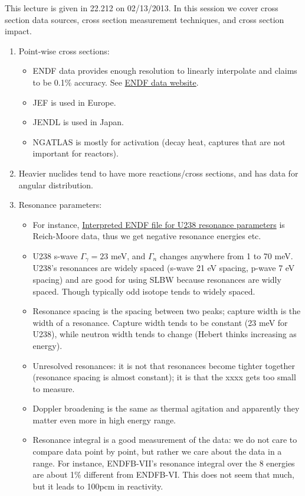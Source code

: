 \documentclass{school-22.211-notes}
\begin{document}
\clearpage
{}
This lecture is given in 22.212 on 02/13/2013. In this session we cover cross section data sources, cross section measurement techniques, and cross section impact.
\begin{enumerate}
\item Point-wise cross sections: 
  \begin{itemize}
  \item ENDF data provides enough resolution to linearly interpolate and claims to be 0.1\% accuracy. See \href{http://www.nndc.bnl.gov/sigma/}{ENDF data website}. 
  \item JEF is used in Europe.
  \item JENDL is used in Japan. 
  \item NGATLAS is mostly for activation (decay heat, captures that are not important for reactors). 
  \end{itemize}
\item Heavier nuclides tend to have more reactions/cross sections, and has data for angular distribution. 
\item Resonance parameters: 
  \begin{itemize}
  \item For instance, \href{http://www.nndc.bnl.gov/sigma/getInterpreted.jsp?evalid=15324&mf=2&mt=151}{Interpreted ENDF file for U238 resonance parameters} is Reich-Moore data, thus we get negative resonance energies etc. 
  \item U238 s-wave $\Gamma_{\gamma} = 23$ meV, and $\Gamma_n$ changes anywhere from 1 to 70 meV. U238's resonances are widely spaced (s-wave 21 eV spacing, p-wave 7 eV spacing) and are good for using SLBW because resonances are widly spaced. Though typically odd isotope tends to widely spaced. 
  \item Resonance spacing is the spacing between two peaks; capture width is the width of a resonance. Capture width tends to be constant (23 meV for U238), while neutron width tends to change (Hebert thinks increasing as energy). 
  \item Unresolved resonances: it is not that resonances become tighter together (resonance spacing is almost constant); it is that the xxxx gets too small to measure. 
  \item Doppler broadening is the same as thermal agitation and apparently they matter even more in high energy range. 
  \item Resonance integral is a good measurement of the data: we do not care to compare data point by point, but rather we care about the data in a range. For instance, ENDFB-VII's resonance integral over the 8 energies are about 1\% different from ENDFB-VI. This does not seem that much, but it leads to 100pcm in reactivity. 
  \end{itemize}
  

\end{enumerate}
\end{document}
